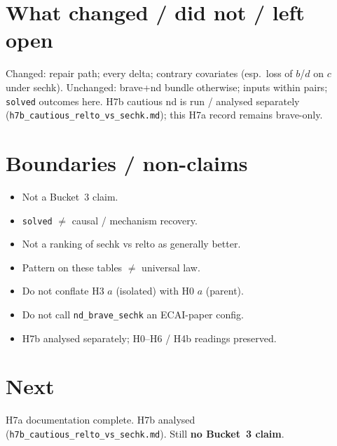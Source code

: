 \documentclass[11pt]{article}
\begin{document}
\section{What changed / did not / left open}

Changed: repair path; every delta; contrary covariates (esp.\ loss of $b$/$d$
on $c$ under sechk).
Unchanged: brave+nd bundle otherwise; inputs within pairs; \texttt{solved}
outcomes here.
H7b cautious nd is run / analysed separately
(\texttt{h7b\_cautious\_relto\_vs\_sechk.md}); this H7a record remains
brave-only.

\section{Boundaries / non-claims}

\begin{itemize}
  \item Not a Bucket~3 claim.
  \item \texttt{solved} $\neq$ causal / mechanism recovery.
  \item Not a ranking of sechk vs relto as generally better.
  \item Pattern on these tables $\neq$ universal law.
  \item Do not conflate H3 $a$ (isolated) with H0 $a$ (parent).
  \item Do not call \texttt{nd\_brave\_sechk} an ECAI-paper config.
  \item H7b analysed separately; H0--H6 / H4b readings preserved.
\end{itemize}

\section{Next}

H7a documentation complete.
H7b analysed (\texttt{h7b\_cautious\_relto\_vs\_sechk.md}).
Still \textbf{no Bucket~3 claim}.
\end{document}
